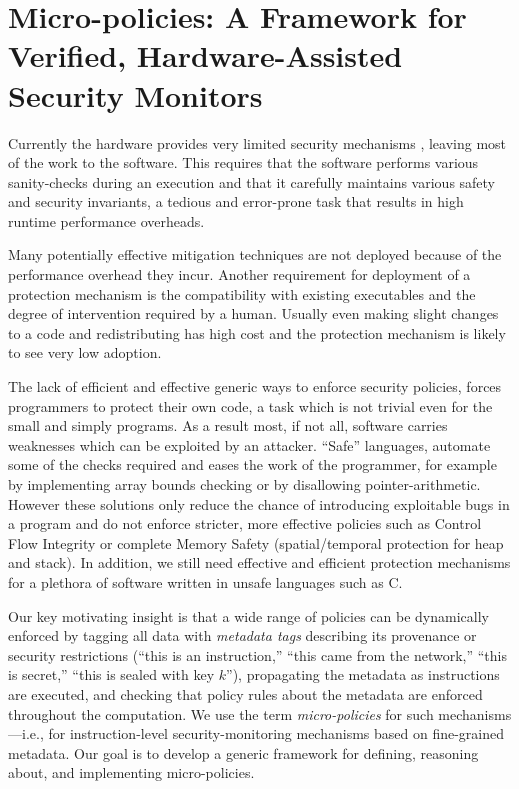 \chapter{Micro-policies: A Framework for Verified, Hardware-Assisted Security Monitors}\label{ch:policies}
Currently the hardware provides very limited security mechanisms , 
leaving most of the work to the software. This requires that the software 
performs various sanity-checks during an execution and that it carefully 
maintains various safety and security invariants, a tedious and error-prone task
that results in high runtime performance overheads.  

Many potentially effective mitigation techniques are not deployed because of the
performance overhead they incur. Another requirement for deployment of a 
protection mechanism is the compatibility with existing executables and 
the degree of intervention required by a human. 
Usually even making slight changes to a code and redistributing has high cost
and the protection mechanism is likely to see very low adoption. 

The lack of efficient and effective generic ways to enforce security policies, 
forces programmers to protect their own code, a task which is not trivial even 
for the small and simply programs. As a result most, if not all, software 
carries weaknesses which can be exploited by an attacker. ``Safe'' languages, 
automate some of the checks required and eases the work of the programmer,
for example by implementing array bounds checking or by disallowing 
pointer-arithmetic. However these solutions only reduce the chance of 
introducing exploitable bugs in a program and do not enforce stricter, 
more effective policies such as Control Flow Integrity
or complete Memory Safety (spatial/temporal protection for heap and stack). 
In addition, we still need effective and efficient protection mechanisms for a 
plethora of software written in unsafe languages such as C.



Our key motivating insight is that a wide range of policies can
be dynamically enforced by tagging all data with {\em metadata tags}
describing its
provenance or security restrictions (\EG ``this is an instruction,'' ``this
came from the network,'' ``this is secret,'' ``this is sealed with key
$k$''), propagating the metadata as instructions are executed, and checking
that policy rules about the metadata are enforced throughout the
computation.  We use the term {\em micro-policies} for such
mechanisms---i.e., for instruction-level security-monitoring mechanisms
based on fine-grained metadata.  Our goal is to develop a generic framework
for defining, reasoning about, and implementing micro-policies.

